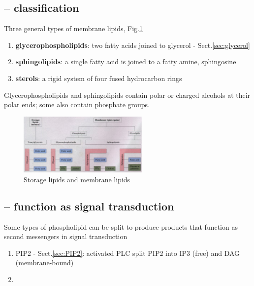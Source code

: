 \subsection{-- classification}
\label{sec:phospholipid-classification}

Three general types of membrane lipids, Fig.\ref{fig:phospholipids}
\begin{enumerate}
  \item {\bf glycerophospholipids}:  two fatty acids joined to glycerol -
  Sect.\ref{sec:glycerol}
  
  \item {\bf sphingolipids}: a single fatty acid is joined to a fatty amine,
  sphingosine
  
  \item {\bf sterols}: a rigid system of four fused hydrocarbon rings
\end{enumerate}

Glycerophospholipids and sphingolipids contain polar or charged alcohols at
their polar ends; some also contain phosphate groups.

\begin{figure}[hbt]
  \centerline{\includegraphics[height=3cm,
    angle=0]{./images/phospholipids.eps}}
\caption{Storage lipids and membrane lipids}
\label{fig:phospholipids}
\end{figure}


\subsection{-- function as signal transduction}

Some  types of phospholipid can be split to produce products that function as
second messengers in signal transduction
\begin{enumerate}
  \item PIP2 - Sect.\ref{sec:PIP2}: activated PLC split PIP2 into IP3 (free) and
  DAG (membrane-bound)
  
  \item 
\end{enumerate}

